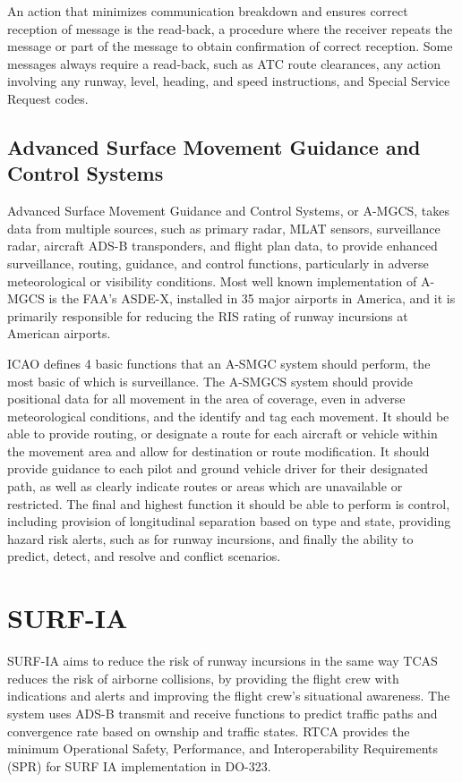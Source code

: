 An action that minimizes communication breakdown and ensures correct reception of message is the read-back, a procedure where the receiver repeats the message or part of the message to obtain confirmation of correct reception. Some messages always require a read-back, such as ATC route clearances, any action involving any runway, level, heading, and speed instructions, and Special Service Request codes.

\subsection{Advanced Surface Movement Guidance and Control Systems}

Advanced Surface Movement Guidance and Control Systems, or A-MGCS, takes data from multiple sources, such as primary radar, MLAT sensors, surveillance radar, aircraft ADS-B transponders, and flight plan data, to provide enhanced surveillance, routing, guidance, and control functions, particularly in adverse meteorological or visibility conditions. Most well known implementation of A-MGCS is the FAA's ASDE-X, installed in 35 major airports in America, and it is primarily responsible for reducing the RIS rating of runway incursions at American airports.

ICAO defines 4 basic functions that an A-SMGC system should perform, the most basic of which is surveillance. The A-SMGCS system should provide positional data for all movement in the area of coverage, even in adverse meteorological conditions, and the identify and tag each movement. It should be able to provide routing, or designate a route for each aircraft or vehicle within the movement area and allow for destination or route modification. It should provide guidance to each pilot and ground vehicle driver for their designated path, as well as clearly indicate routes or areas which are unavailable or restricted. The final and highest function it should be able to perform is control, including provision of longitudinal separation based on type and state, providing hazard risk alerts, such as for runway incursions, and finally the ability to predict, detect, and resolve and conflict scenarios.



\section{SURF-IA}

SURF-IA aims to reduce the risk of runway incursions in the same way TCAS reduces the risk of airborne collisions, by providing the flight crew with indications and alerts and improving the flight crew's situational awareness. The system uses ADS-B transmit and receive functions to predict traffic paths and convergence rate based on ownship and traffic states. RTCA provides the minimum Operational Safety, Performance, and Interoperability Requirements (SPR) for SURF IA implementation in DO-323. 

